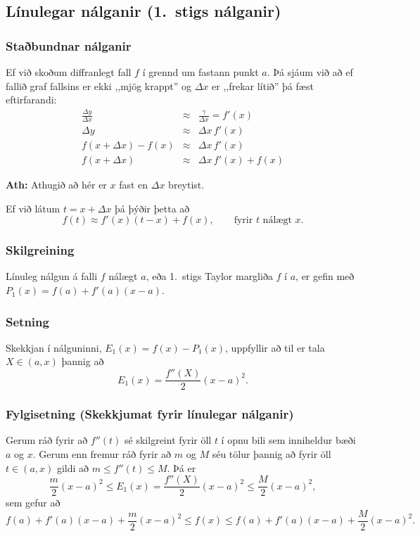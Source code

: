 \documentclass[icelandic,a4paper,12pt]{article}
\begin{document}
\subsection{Línulegar nálganir (1.~stigs nálganir)}
\subsubsection{Staðbundnar nálganir}
Ef við skoðum diffranlegt fall $f$ í grennd um fastann punkt $a$.
Þá sjáum við að ef fallið graf fallsins er ekki ,,mjög krappt''
og $\Delta x$ er ,,frekar lítið'' þá fæst eftirfarandi:
\begin{eqnarray*}
	\frac{\Delta y}{\Delta x} &\approx& \frac{\gamma}{\Delta x} = f'(x)\\
	\Delta y &\approx& \Delta x \, f'(x) \\
	f(x+\Delta x) - f(x) &\approx& \Delta x \, f'(x)\\
	f(x+\Delta x) &\approx& \Delta x\, f'(x) + f(x)
\end{eqnarray*}

\textbf{Ath:} Athugið að hér er $x$ fast en $\Delta x$ breytist.
	
Ef við látum $t = x + \Delta x$ þá þýðir þetta að 
$$
  f(t) \approx f'(x)(t-x) + f(x), \qquad \text{fyrir $t$ nálægt $x$}.
$$

\subsubsection{Skilgreining} 
Línuleg nálgun á falli $f$ nálægt $a$, eða 1.~stigs Taylor margliða 
$f$ í $a$, er gefin með $P_1(x)=f(a)+f'(a)(x-a)$.

\subsubsection{Setning}
Skekkjan í nálguninni, $E_1(x)=f(x)-P_1(x)$, uppfyllir 
að til er tala $X \in (a,x)$ þannig að 
$$
	E_1(x)=\frac{f''(X)}{2}(x-a)^2.
$$

\subsubsection{Fylgisetning (Skekkjumat fyrir línulegar nálganir)}   
Gerum ráð fyrir að $f''(t)$ sé skilgreint fyrir öll $t$ í opnu bili sem inniheldur bæði
$a$ og $x$.  Gerum enn fremur ráð fyrir að $m$ og $M$ séu tölur þannig
að fyrir öll $t\in (a, x)$ gildi að $m\leq f''(t)\leq M$. Þá er
$$\frac{m}{2}(x-a)^2\leq E_1(x)
=\frac{f''(X)}{2}(x-a)^2\leq \frac{M}{2}(x-a)^2,$$
\pause sem gefur að
$$
  f(a)+f'(a)(x-a)+\frac{m}{2}(x-a)^2\leq f(x) 
\leq f(a)+f'(a)(x-a)+\frac{M}{2}(x-a)^2.
$$
\end{document}
